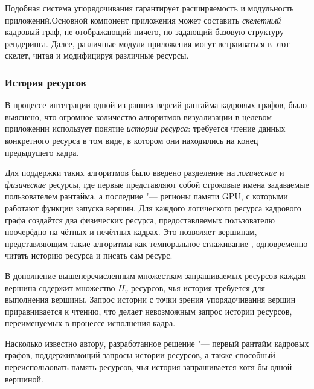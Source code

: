 Подобная система упорядочивания гарантирует расширяемость и модульность приложений.Основной компонент приложения может составить \textit{скелетный} кадровый граф, не отображающий ничего, но задающий базовую структуру рендеринга.
Далее, различные модули приложения могут встраиваться в этот скелет, читая и модифицируя различные ресурсы.

\subsubsection{История ресурсов}
В процессе интеграции одной из ранних версий рантайма кадровых графов, было выяснено, что огромное количество алгоритмов визуализации в целевом приложении использует понятие \textit{истории ресурса}: требуется чтение данных конкретного ресурса в том виде, в котором они находились на конец предыдущего кадра.

Для поддержки таких алгоритмов было введено разделение на \textit{логические} и \textit{физические} ресурсы, где первые представляют собой строковые имена задаваемые пользователем рантайма, а последние "--- регионы памяти GPU, с которыми работают функции запуска вершин.
Для каждого логического ресурса кадрового графа создаётся два физических ресурса, предоставляемых пользователю поочерёдно на чётных и нечётных кадрах.
Это позволяет вершинам, представляющим такие алгоритмы как темпоральное сглаживание \cite{yang2020survey}, одновременно читать историю ресурса и писать сам ресурс.

В дополнение вышеперечисленным множествам запрашиваемых ресурсов каждая вершина содержит множество $H_v$ ресурсов, чья история требуется для выполнения вершины.
Запрос истории с точки зрения упорядочивания вершин приравнивается к чтению, что делает невозможным запрос истории ресурсов, переименуемых в процессе исполнения кадра.

Насколько известно автору, разработанное решение "--- первый рантайм кадровых графов, поддерживающий запросы истории ресурсов, а также способный переиспользовать память ресурсов, чья история запрашивается хотя бы одной вершиной.


